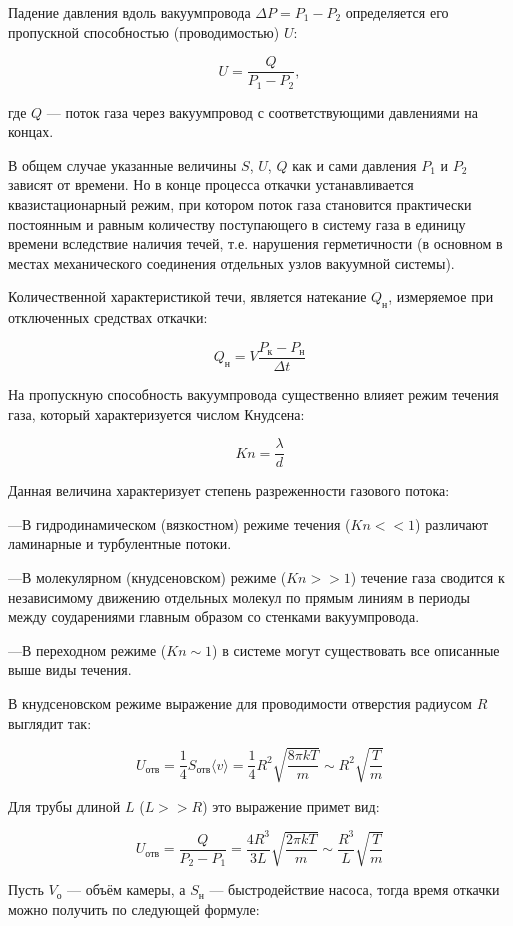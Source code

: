 \documentclass[12pt,a4paper]{article}
\begin{document}
Падение  давления  вдоль  вакуумпровода $\Delta P = P_1 - P_2$ определяется его пропускной способностью (проводимостью) $U$:

\[
    U = \frac{Q}{P_1 - P_2},
\]

где $Q$ --- поток газа через вакуумпровод с соответствующими давлениями на концах.

В общем случае указанные величины $S$, $U$, $Q$ как и сами давления $P_1$ и $P_2$ зависят от времени. Но в конце процесса откачки устанавливается    квазистационарный режим, при котором поток газа становится практически постоянным и равным количеству поступающего в систему газа в единицу времени вследствие наличия течей, т.е. нарушения герметичности (в основном в местах механического соединения отдельных узлов вакуумной системы). 

Количественной  характеристикой  течи, является натекание $Q_н$, измеряемое при отключенных средствах откачки:

\[
    Q_н = V \frac{P_к - P_н}{\Delta t}
\]

На пропускную способность вакуумпровода существенно влияет режим течения газа, который характеризуется числом Кнудсена:

\[
    Kn = \frac{\lambda}{d}
\]

Данная величина характеризует степень разреженности газового потока:

---В гидродинамическом  (вязкостном) режиме  течения  ($Kn << 1$) различают ламинарные и турбулентные потоки.

---В молекулярном (кнудсеновском) режиме  ($Kn >> 1$) течение газа сводится к независимому движению отдельных молекул по прямым линиям в периоды между соударениями главным образом со стенками вакуумпровода.

---В переходном режиме ($Kn \sim 1$) в системе могут существовать все описанные выше виды течения.

В  кнудсеновском  режиме выражение для проводимости отверстия радиусом $R$ выглядит так:

\[
    U_{отв} = \frac{1}{4} S_{отв} \langle v \rangle  = \frac{1}{4} R^2 \sqrt{\frac{8 \pi kT}{m}} \sim R^2 \sqrt{\frac{T}{m}}
\]

Для трубы длиной $L$ ($L >> R$) это выражение примет вид:

\[
    U_{отв} = \frac{Q}{P_2 - P_1} = \frac{4 R^3}{3 L} \sqrt{\frac{2 \pi kT}{m}} \sim \frac{R^3}{L} \sqrt{\frac{T}{m}}
\]

Пусть $V_о$ --- объём камеры, а $S_н$ --- быстродействие насоса, тогда время откачки можно получить по следующей формуле:
\end{document}
